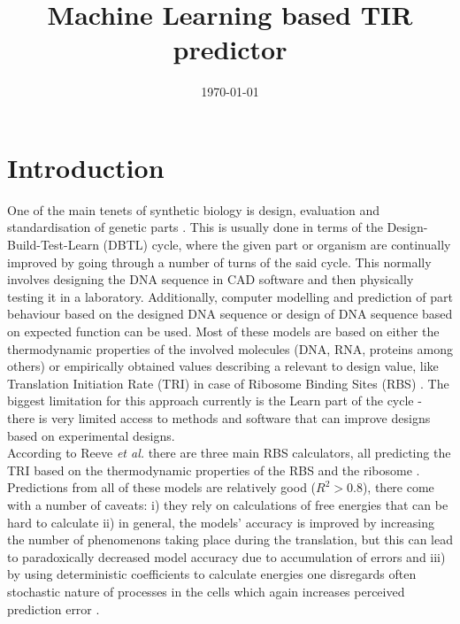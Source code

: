 \documentclass{article}
\title{Machine Learning based TIR predictor}
\author{}
\date{\today{}}
\begin{document}
\maketitle

\section{Introduction}

One of the main tenets of synthetic biology is design, evaluation and standardisation of genetic parts \cite{Brophy2014,Canton2008,Stanton2014}. This is usually done in terms of the Design-Build-Test-Learn (DBTL) cycle, where the given part or organism are continually improved by going through a number of turns of the said cycle. This normally involves designing the DNA sequence in CAD software and then physically testing it in a laboratory. Additionally, computer modelling and prediction of part behaviour based on the designed DNA sequence or design of DNA sequence based on expected function can be used\cite{Yeoh2019,Nielsen2016}. Most of these models are based on either the thermodynamic properties of the involved molecules (DNA, RNA, proteins among others) or empirically obtained values describing a relevant to design value, like Translation Initiation Rate (TRI) in case of Ribosome Binding Sites (RBS) \cite{Xia1998,Chen2013,Reeve2014}. The biggest limitation for this approach currently is the Learn part of the cycle - there is very limited access to methods and software that can improve designs based on experimental designs.\\
According to Reeve \emph{et al.} there are three main RBS calculators, all predicting the TRI based on the thermodynamic properties of the RBS and the ribosome \cite{Seo2013,Na2010,Salis2009}. Predictions from all of these models are relatively good ($R^2 >0.8$), there come with a number of caveats: i) they rely on calculations of free energies that can be hard to calculate ii) in general, the models' accuracy is improved by increasing the number of phenomenons taking place during the translation, but this can lead to paradoxically decreased model accuracy due to accumulation of errors \cite{EspahBorujeni2016} and iii) by using deterministic coefficients to calculate energies one disregards often stochastic nature of processes in the cells which again increases perceived prediction error \cite{Goss1998}. \\
\end{document}
